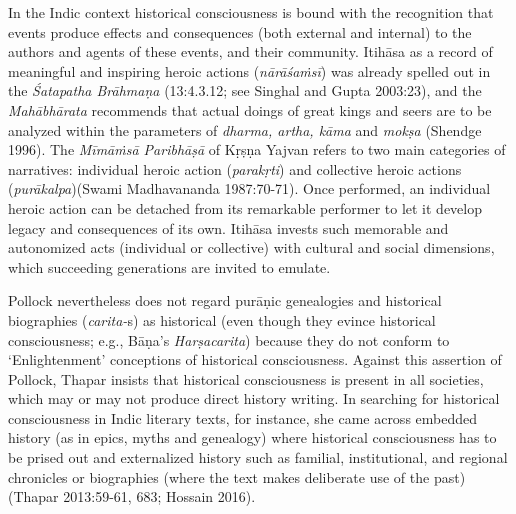 In the Indic context historical consciousness is bound with the recognition that events produce effects and consequences (both external and internal) to the authors and agents of these events, and their community. Itihāsa as a record of meaningful and inspiring heroic actions (\textit{nārāśaṁsī}) was already spelled out in the \textit{Śatapatha Brāhmaṇa} (13:4.3.12; see Singhal and Gupta 2003:23), and the \textit{Mahābhārata} recommends that actual doings of great kings and seers are to be analyzed within the parameters of \textit{dharma, artha, kāma} and \textit{mokṣa} (Shendge 1996). The \textit{Mīmāṁsā Paribhāṣā} of Kṛṣṇa Yajvan refers to two main categories of narratives: individual heroic action (\textit{parakṛti}) and collective heroic actions (\textit{purākalpa})(Swami Madhavananda 1987:70-71). Once performed, an individual heroic action can be detached from its remarkable performer to let it develop legacy and consequences of its own. Itihāsa invests such memorable and autonomized acts (individual or collective) with cultural and social dimensions, which succeeding generations are invited to emulate.

Pollock nevertheless does not regard purāṇic genealogies and historical biographies (\textit{carita-}s) as historical (even though they evince historical consciousness; e.g., Bāṇa’s \textit{Harṣacarita}) because they do not conform to ‘Enlightenment’ conceptions of historical consciousness. Against this assertion of Pollock, Thapar insists that historical consciousness is present in all societies, which may or may not produce direct history writing. In searching for historical consciousness in Indic literary texts, for instance, she came across embedded history (as in epics, myths and genealogy) where historical consciousness has to be prised out and externalized history such as familial, institutional, and regional chronicles or biographies (where the text makes deliberate use of the past)(Thapar 2013:59-61, 683; Hossain 2016).


